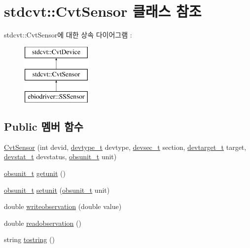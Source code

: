 \hypertarget{classstdcvt_1_1CvtSensor}{}\section{stdcvt\+:\+:Cvt\+Sensor 클래스 참조}
\label{classstdcvt_1_1CvtSensor}
stdcvt\+:\+:Cvt\+Sensor에 대한 상속 다이어그램 \+: \begin{figure}[H]
\begin{center}
\leavevmode
\includegraphics[height=3.000000cm]{classstdcvt_1_1CvtSensor}
\end{center}
\end{figure}
\subsection*{Public 멤버 함수}
\begin{DoxyCompactItemize}
\item 
\hyperlink{classstdcvt_1_1CvtSensor_a55d2db9b5706a0b94cb92be54328cd1f}{Cvt\+Sensor} (int devid, \hyperlink{cvtcode_8h_ae8e34073e35cef0bb47c7fa535fc638b}{devtype\+\_\+t} devtype, \hyperlink{cvtcode_8h_a268eebb73363e24b9e65fd51973bd9c0}{devsec\+\_\+t} section, \hyperlink{cvtcode_8h_a2b37fd5cc4d40c0b8c4b987c271e5ceb}{devtarget\+\_\+t} target, \hyperlink{cvtcode_8h_ad21cd565f839adc5b19a0993e7da7278}{devstat\+\_\+t} devstatus, \hyperlink{cvtcode_8h_a6d4ed81d95144c5eedcd08eda1e800a4}{obsunit\+\_\+t} unit)
\item 
\hyperlink{cvtcode_8h_a6d4ed81d95144c5eedcd08eda1e800a4}{obsunit\+\_\+t} \hyperlink{classstdcvt_1_1CvtSensor_ac4342e95b9977063bb4e37ce1418759c}{getunit} ()
\item 
\hyperlink{cvtcode_8h_a6d4ed81d95144c5eedcd08eda1e800a4}{obsunit\+\_\+t} \hyperlink{classstdcvt_1_1CvtSensor_a0e13dd86635e5077dbadc6c0fe396b5e}{setunit} (\hyperlink{cvtcode_8h_a6d4ed81d95144c5eedcd08eda1e800a4}{obsunit\+\_\+t} unit)
\item 
double \hyperlink{classstdcvt_1_1CvtSensor_aba7a61d2f5fac1c100a17a8831727b29}{writeobservation} (double value)
\item 
double \hyperlink{classstdcvt_1_1CvtSensor_a2d3b6d09f67166af035189b59590cf82}{readobservation} ()
\item 
string \hyperlink{classstdcvt_1_1CvtSensor_aa9f10c534408e35f1d761941a8320e50}{tostring} ()
\end{DoxyCompactItemize}


